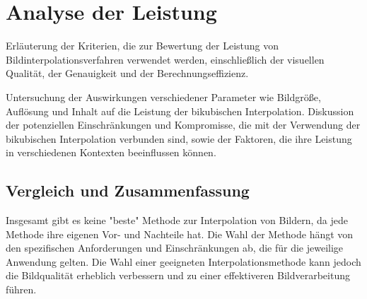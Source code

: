 \section{Analyse der Leistung}

    Erläuterung der Kriterien, die zur Bewertung der Leistung von Bildinterpolationsverfahren verwendet werden, einschließlich der visuellen Qualität, der Genauigkeit und der Berechnungseffizienz.

    Untersuchung der Auswirkungen verschiedener Parameter wie Bildgröße, Auflösung und Inhalt auf die Leistung der bikubischen Interpolation.
    Diskussion der potenziellen Einschränkungen und Kompromisse, die mit der Verwendung der bikubischen Interpolation verbunden sind, sowie der Faktoren, die ihre Leistung in verschiedenen Kontexten beeinflussen können.

\subsection{Vergleich und Zusammenfassung}

Insgesamt gibt es keine "beste" Methode zur Interpolation von Bildern, da jede Methode ihre eigenen Vor- und Nachteile hat. 
Die Wahl der Methode hängt von den spezifischen Anforderungen und Einschränkungen ab, die für die jeweilige Anwendung gelten. 
Die Wahl einer geeigneten Interpolationsmethode kann jedoch die Bildqualität erheblich verbessern und zu einer effektiveren Bildverarbeitung führen.
\newpage